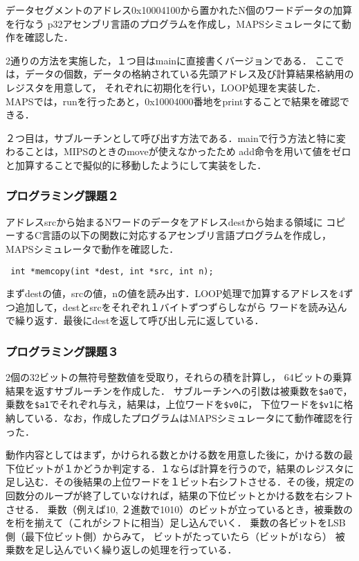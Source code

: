 \documentclass{jarticle}[11pt]
\begin{document}
  データセグメントのアドレス0x10004100から置かれたN個のワードデータの加算を行なう
  p32アセンブリ言語のプログラムを作成し，MAPSシミュレータにて動作を確認した．

  2通りの方法を実施した，１つ目はmainに直接書くバージョンである．
  ここでは，データの個数，データの格納されている先頭アドレス及び計算結果格納用のレジスタを用意して，
  それぞれに初期化を行い，LOOP処理を実装した．
  MAPSでは，runを行ったあと，0x10004000番地をprintすることで結果を確認できる．

  ２つ目は，サブルーチンとして呼び出す方法である．mainで行う方法と特に変わることは，MIPSのときのmoveが使えなかったため
  add命令を用いて値をゼロと加算することで擬似的に移動したようにして実装をした．
  
  \subsubsection{プログラミング課題２}

  アドレスsrcから始まるNワードのデータをアドレスdestから始まる領域に
  コピーするC言語の以下の関数に対応するアセンブリ言語プログラムを作成し，
  MAPSシミュレータで動作を確認した．

  \verb| int *memcopy(int *dest, int *src, int n);|

  まずdestの値，srcの値，nの値を読み出す．LOOP処理で加算するアドレスを4ずつ追加して，destとsrcをそれぞれ１バイトずつずらしながら
  ワードを読み込んで繰り返す．最後にdestを返して呼び出し元に返している．

  \subsubsection{プログラミング課題３}

  2個の32ビットの無符号整数値を受取り，それらの積を計算し， 64ビットの乗算結果を返すサブルーチンを作成した．
  サブルーチンへの引数は被乗数を\verb|$a0|で，乗数を\verb|$a1|でそれぞれ与え，結果は，上位ワードを\verb|$v0|に，
  下位ワードを\verb|$v1|に格納している．なお，作成したプログラムはMAPSシミュレータにて動作確認を行った．
  
  動作内容としてはまず，かけられる数とかける数を用意した後に，かける数の最下位ビットが１かどうか判定する．１ならば計算を行うので，結果のレジスタに
  足し込む．その後結果の上位ワードを１ビット右シフトさせる．その後，規定の回数分のループが終了していなければ，結果の下位ビットとかける数を右シフトさせる．
  乗数（例えば10, ２進数で1010）のビットが立っているとき，被乗数のを桁を揃えて（これがシフトに相当）足し込んでいく．
  乗数の各ビットをLSB側（最下位ビット側）からみて， ビットがたっていたら（ビットが1なら） 被乗数を足し込んでいく繰り返しの処理を行っている．
\end{document}
